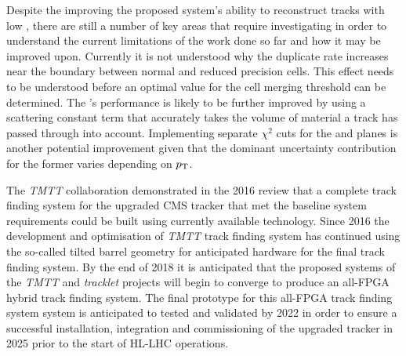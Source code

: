 Despite the improving the proposed system's ability to reconstruct tracks with low \pT, there are still a number of key areas that require investigating in order to understand the current limitations of the work done so far and how it may be improved upon.
Currently it is not understood why the duplicate rate increases near the boundary between normal and reduced precision \HT cells.
This effect needs to be understood before an optimal value for the cell merging threshold can be determined.
The \KF's performance is likely to be further improved by using a scattering constant term that accurately takes the volume of material a track has passed through into account.
Implementing separate \KF $\chi^{2}$ cuts for the \rphi and \rz planes is another potential improvement given that the dominant uncertainty contribution for the former varies depending on $p_{\mathrm{T}}$.


The \emph{TMTT} collaboration demonstrated in the 2016 review that a complete track finding system for the upgraded CMS tracker that met the baseline system requirements could be built using currently available technology.
Since 2016 the development and optimisation of \emph{TMTT} track finding system has continued using the so-called tilted barrel geometry for anticipated hardware for the final track finding system.
By the end of 2018 it is anticipated that the proposed systems of the \emph{TMTT} and \emph{tracklet} projects will begin to converge to produce an all-FPGA hybrid track finding system.
The final prototype for this all-FPGA track finding system system is anticipated to tested and validated by 2022 in order to ensure a successful installation, integration and commissioning of the upgraded tracker in 2025 prior to the start of HL-LHC operations.

%

